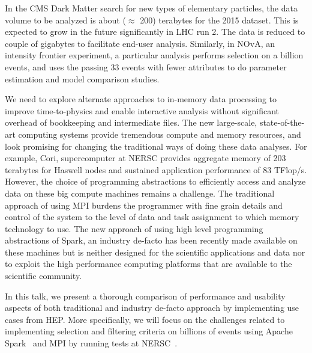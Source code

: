In the CMS Dark Matter search for new types of elementary particles,
the data volume to be analyzed is about ($\approx$ 200) terabytes for the 2015 dataset. 
 This is expected to grow in the future significantly in LHC run 2. 
 The data is reduced to couple of gigabytes to facilitate end-user analysis.  
Similarly, in NOvA, an intensity frontier experiment, a particular analysis 
 performs selection on a billion events, and uses the passing 33 events with fewer 
 attributes to do parameter estimation and model comparison studies. 

We need to explore alternate approaches to in-memory data processing to 
improve time-to-physics and enable interactive analysis without significant overhead of bookkeeping and intermediate 
files. The new large-scale, state-of-the-art computing systems provide tremendous compute and memory resources, and look promising for changing the traditional ways of doing these data analyses. 
For example, Cori, supercomputer at NERSC provides aggregate memory of 203 terabytes for Haswell nodes and sustained application performance of 83 TFlop/s. 
However, the choice of programming abstractions to efficiently access and analyze data on these big compute machines remains a challenge. 
The traditional approach of using MPI burdens the programmer with fine grain details and control of the system to the level of data and task assignment to which memory technology to use. The new approach of using high level programming abstractions of Spark, an industry de-facto has been recently made available on these machines but is neither designed for the scientific applications and data nor to exploit the high performance computing platforms that are 
available to the scientific community.

In this talk, we present a thorough comparison of performance and usability aspects of 
both traditional and industry de-facto approach by implementing use cases from HEP.  
More specifically, we will focus on the challenges related to implementing selection and 
filtering criteria on billions of events using Apache Spark~\cite{spark,spark1} and MPI by running tests at NERSC~\cite{nersc-spark}. 
